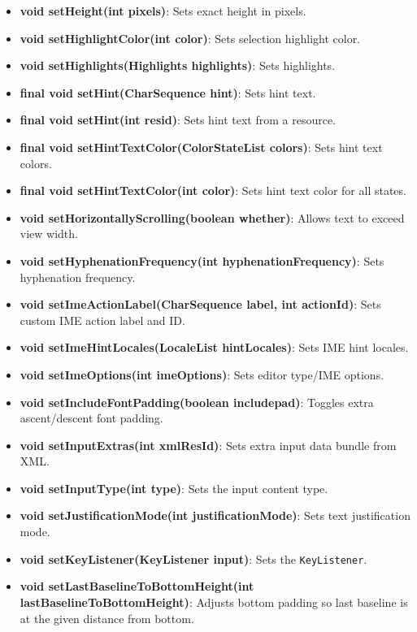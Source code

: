 \documentclass{report}
\begin{document}
\begin{itemize}
\begin{itemize}
                \item \textbf{void setHeight(int pixels)}: Sets exact height in pixels.
                \item \textbf{void setHighlightColor(int color)}: Sets selection highlight color.
                \item \textbf{void setHighlights(Highlights highlights)}: Sets highlights.
                \item \textbf{final void setHint(CharSequence hint)}: Sets hint text.
                \item \textbf{final void setHint(int resid)}: Sets hint text from a resource.
                \item \textbf{final void setHintTextColor(ColorStateList colors)}: Sets hint text colors.
                \item \textbf{final void setHintTextColor(int color)}: Sets hint text color for all states.
                \item \textbf{void setHorizontallyScrolling(boolean whether)}: Allows text to exceed view width.
                \item \textbf{void setHyphenationFrequency(int hyphenationFrequency)}: Sets hyphenation frequency.
                \item \textbf{void setImeActionLabel(CharSequence label, int actionId)}: Sets custom IME action label and ID.
                \item \textbf{void setImeHintLocales(LocaleList hintLocales)}: Sets IME hint locales.
                \item \textbf{void setImeOptions(int imeOptions)}: Sets editor type/IME options.
                \item \textbf{void setIncludeFontPadding(boolean includepad)}: Toggles extra ascent/descent font padding.
                \item \textbf{void setInputExtras(int xmlResId)}: Sets extra input data bundle from XML.
                \item \textbf{void setInputType(int type)}: Sets the input content type.
                \item \textbf{void setJustificationMode(int justificationMode)}: Sets text justification mode.
                \item \textbf{void setKeyListener(KeyListener input)}: Sets the \texttt{KeyListener}.
                \item \textbf{void setLastBaselineToBottomHeight(int lastBaselineToBottomHeight)}: Adjusts bottom padding so last baseline is at the given distance from bottom.

\end{itemize}
\end{itemize}
\end{document}
